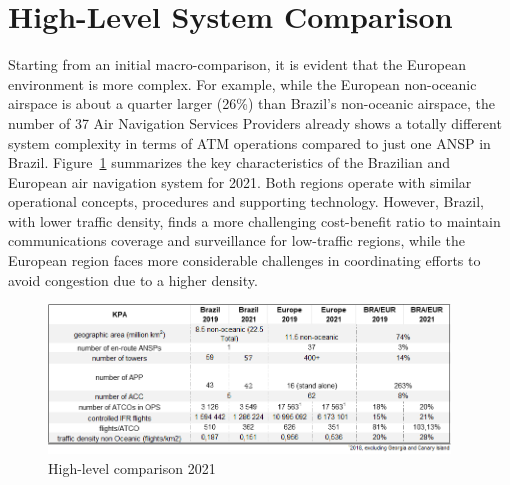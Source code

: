\documentclass[
  a4paper,
  DIV=11,
  numbers=noendperiod]{scrreprt}
\begin{document}
\hypertarget{high-level-system-comparison}{%
\section{High-Level System
Comparison}\label{high-level-system-comparison}}

Starting from an initial macro-comparison, it is evident that the
European environment is more complex. For example, while the European
non-oceanic airspace is about a quarter larger (26\%) than Brazil's
non-oceanic airspace, the number of 37 Air Navigation Services Providers
already shows a totally different system complexity in terms of ATM
operations compared to just one ANSP in Brazil. Figure~\ref{fig-test}
summarizes the key characteristics of the Brazilian and European air
navigation system for 2021. Both regions operate with similar
operational concepts, procedures and supporting technology. However,
Brazil, with lower traffic density, finds a more challenging
cost-benefit ratio to maintain communications coverage and surveillance
for low-traffic regions, while the European region faces more
considerable challenges in coordinating efforts to avoid congestion due
to a higher density.

\begin{figure}[h]

{\centering \includegraphics[width=0.95\textwidth,height=\textheight]{././figures/Summary_Table_2021_Sep23.png}

}

\caption{\label{fig-test}High-level comparison 2021}

\end{figure}
\end{document}
